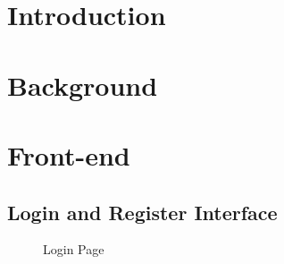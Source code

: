 \documentclass[a4paper,12pt]{article}
\numberwithin{equation}{section} %
\numberwithin{figure}{section}
\begin{document}
\section{Introduction}



\section{Background}

\section{Front-end}

\subsection{Login and Register Interface}
\begin{figure}[H]
\centering
{}
\caption{Login Page}
\label{login}
\end{figure}
\end{document}
